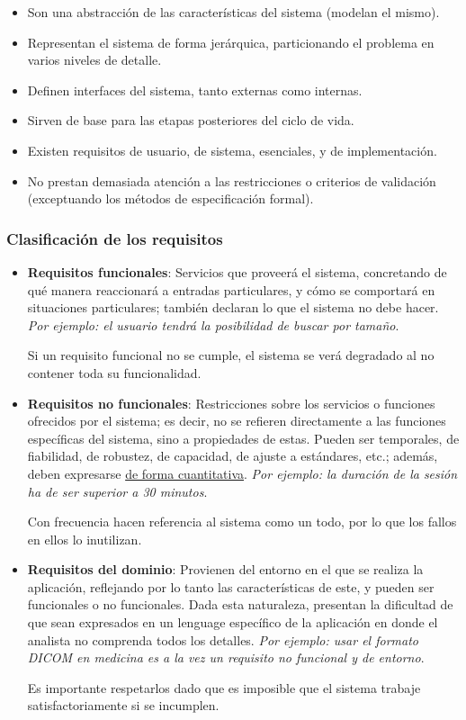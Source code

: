 \begin{itemize}
    \item Son una abstracción de las características del sistema (modelan el mismo).
    \item Representan el sistema de forma jerárquica, particionando el problema en varios niveles de detalle.
    \item Definen interfaces del sistema, tanto externas como internas.
    \item Sirven de base para las etapas posteriores del ciclo de vida.
    \item Existen requisitos de usuario, de sistema, esenciales, y de implementación.
    \item No prestan demasiada atención a las restricciones o criterios de validación (exceptuando los métodos de especificación formal).
\end{itemize}

\subsubsection{Clasificación de los requisitos}
\begin{itemize}
    \item \textbf{Requisitos funcionales}: Servicios que proveerá el sistema, concretando de qué manera reaccionará a entradas particulares, y cómo se comportará en situaciones particulares; también declaran lo que el sistema no debe hacer. \textit{Por ejemplo: el usuario tendrá la posibilidad de buscar por tamaño}.
    
    Si un requisito funcional no se cumple, el sistema se verá degradado al no contener toda su funcionalidad.

    \item \textbf{Requisitos no funcionales}: Restricciones sobre los servicios o funciones ofrecidos por el sistema; es decir, no se refieren directamente a las funciones específicas del sistema, sino a propiedades de estas. Pueden ser temporales, de fiabilidad, de robustez, de capacidad, de ajuste a estándares, etc.; además, deben expresarse \uline{de forma cuantitativa}. \textit{Por ejemplo: la duración de la sesión ha de ser superior a 30 minutos}.
    
    Con frecuencia hacen referencia al sistema como un todo, por lo que los fallos en ellos lo inutilizan.

    \item \textbf{Requisitos del dominio}: Provienen del entorno en el que se realiza la aplicación, reflejando por lo tanto las características de este, y pueden ser funcionales o no funcionales. Dada esta naturaleza, presentan la dificultad de que sean expresados en un lenguage específico de la aplicación en donde el analista no comprenda todos los detalles. \textit{Por ejemplo: usar el formato DICOM en medicina es a la vez un requisito no funcional y de entorno}.
    
    Es importante respetarlos dado que es imposible que el sistema trabaje satisfactoriamente si se incumplen.
\end{itemize}

